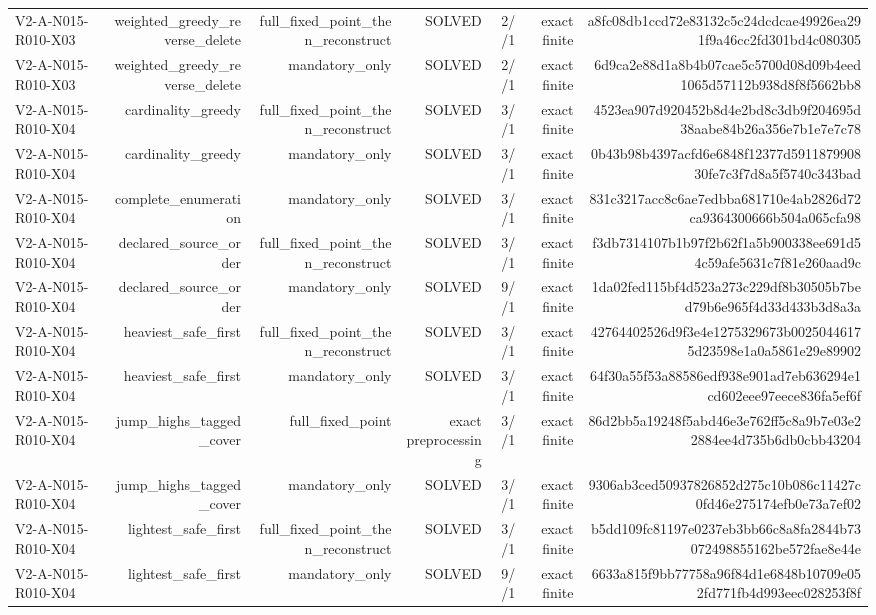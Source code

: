 {\begin{longtable}{lrrrrrr}
V2-A-N015-R010-X03 & weighted\_greedy\_reverse\_delete & full\_fixed\_point\_then\_reconstruct & SOLVED & 2//1 & exact finite & a8fc08db1ccd72e83132c5c24dcdcae49926ea291f9a46cc2fd301bd4c080305 \\
V2-A-N015-R010-X03 & weighted\_greedy\_reverse\_delete & mandatory\_only & SOLVED & 2//1 & exact finite & 6d9ca2e88d1a8b4b07cae5c5700d08d09b4eed1065d57112b938d8f8f5662bb8 \\
V2-A-N015-R010-X04 & cardinality\_greedy & full\_fixed\_point\_then\_reconstruct & SOLVED & 3//1 & exact finite & 4523ea907d920452b8d4e2bd8c3db9f204695d38aabe84b26a356e7b1e7e7c78 \\
V2-A-N015-R010-X04 & cardinality\_greedy & mandatory\_only & SOLVED & 3//1 & exact finite & 0b43b98b4397acfd6e6848f12377d591187990830fe7c3f7d8a5f5740c343bad \\
V2-A-N015-R010-X04 & complete\_enumeration & mandatory\_only & SOLVED & 3//1 & exact finite & 831c3217acc8c6ae7edbba681710e4ab2826d72ca9364300666b504a065cfa98 \\
V2-A-N015-R010-X04 & declared\_source\_order & full\_fixed\_point\_then\_reconstruct & SOLVED & 3//1 & exact finite & f3db7314107b1b97f2b62f1a5b900338ee691d54c59afe5631c7f81e260aad9c \\
V2-A-N015-R010-X04 & declared\_source\_order & mandatory\_only & SOLVED & 9//1 & exact finite & 1da02fed115bf4d523a273c229df8b30505b7bed79b6e965f4d33d433b3d8a3a \\
V2-A-N015-R010-X04 & heaviest\_safe\_first & full\_fixed\_point\_then\_reconstruct & SOLVED & 3//1 & exact finite & 42764402526d9f3e4e1275329673b00250446175d23598e1a0a5861e29e89902 \\
V2-A-N015-R010-X04 & heaviest\_safe\_first & mandatory\_only & SOLVED & 3//1 & exact finite & 64f30a55f53a88586edf938e901ad7eb636294e1cd602eee97eece836fa5ef6f \\
V2-A-N015-R010-X04 & jump\_highs\_tagged\_cover & full\_fixed\_point & exact preprocessing & 3//1 & exact finite & 86d2bb5a19248f5abd46e3e762ff5c8a9b7e03e22884ee4d735b6db0cbb43204 \\
V2-A-N015-R010-X04 & jump\_highs\_tagged\_cover & mandatory\_only & SOLVED & 3//1 & exact finite & 9306ab3ced50937826852d275c10b086c11427c0fd46e275174efb0e73a7ef02 \\
V2-A-N015-R010-X04 & lightest\_safe\_first & full\_fixed\_point\_then\_reconstruct & SOLVED & 3//1 & exact finite & b5dd109fc81197e0237eb3bb66c8a8fa2844b73072498855162be572fae8e44e \\
V2-A-N015-R010-X04 & lightest\_safe\_first & mandatory\_only & SOLVED & 9//1 & exact finite & 6633a815f9bb77758a96f84d1e6848b10709e052fd771fb4d993eec028253f8f \\

\end{longtable}}

